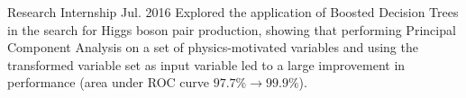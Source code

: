 \begin{cventries}
    {Research Internship}
    {}
    {Jul. 2016}
    {Explored the application of Boosted Decision Trees in the search for Higgs boson pair production, showing that performing Principal Component Analysis on a set of physics-motivated variables and using the transformed variable set as input variable led to a large improvement in performance (area under ROC curve $97.7\% \to 99.9\%$).}


\end{cventries}